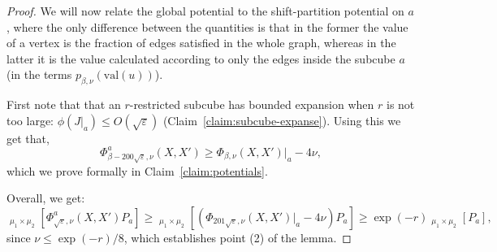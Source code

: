 \documentclass[11pt]{article}
\DeclareMathOperator*{\pE}{\widetilde{\mathbb{E}}}
\def \sos {SoS\xspace}
\def \eps {{\varepsilon}}
\def \val {\mathrm{val}}
\newtheorem{claim}[theorem]{Claim}
\theoremstyle{definition}
\begin{document}
\begin{proof}
We will now relate the global potential to the shift-partition potential on $a$, where the only difference between the quantities is that in the former the value of a vertex is the fraction of edges satisfied in the whole graph, whereas in the latter it is the value calculated according to only the edges inside the subcube $a$ (in the terms $p_{\beta,\nu}(\val(u))$).

First note that that an $r$-restricted subcube has bounded expansion when $r$ is not too large: $\phi(J|_a) \leq O(\sqrt{\eps})$ (Claim~\ref{claim:subcube-expanse}). Using this we get that,
\[
\Phi^a_{\beta -200\sqrt{\eps},\nu}(X,X') \ge \Phi_{\beta,\nu}(X,X')|_a - 4\nu,
\]
which we prove formally in Claim~\ref{claim:potentials}.



Overall, we get:
\[\pE_{\mu_1 \times \mu_2}[\Phi^a_{\sqrt{\eps},\nu}(X,X')P_a] \ge \pE_{\mu_1 \times \mu_2}[(\Phi_{201\sqrt{\eps},\nu}(X,X')|_a - 4\nu) P_a] \geq \exp(-r)\pE_{\mu_1 \times \mu_2}[P_a],\]
since $\nu \leq \exp(-r)/8$, which establishes point (2) of the 
lemma.


\end{proof}
\end{document}
